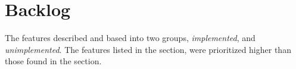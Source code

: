\chapter{Backlog}
\label{chap:backlog}

The features described and based into two groups, \emph{implemented}, and \emph{unimplemented}.
The features listed in the  section, were prioritized higher than those found in the  section. 





